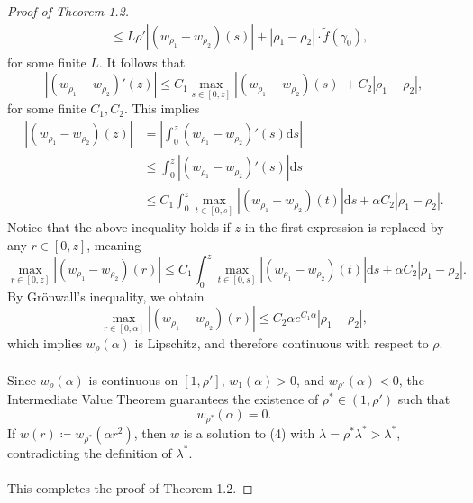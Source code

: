 \documentclass{article}
\begin{document}
\begin{proof}[Proof of Theorem 1.2]
\begin{align*}
        &\leq L\rho'|(w_{\rho_1} - w_{\rho_2})(s)| + |\rho_1-\rho_2|\cdot \tilde f(\gamma_0),
    \end{align*}
    for some finite $L$. It follows that
    \[|(w_{\rho_1} - w_{\rho_2})'(z)|\leq C_1\max_{s\in[0,z]}|(w_{\rho_1} - w_{\rho_2})(s)| + C_2 |\rho_1 -\rho_2|,\]
    for some finite $C_1, C_2$.
    This implies
    \begin{align*}
        |(w_{\rho_1} - w_{\rho_2})(z)| &= \left|\int_0^z(w_{\rho_1} - w_{\rho_2})'(s)\mathrm{d}s\right| \\
        &\leq \int_0^z |(w_{\rho_1} - w_{\rho_2})'(s)|\mathrm{d}s \\
        &\leq C_1\int_0^z\max_{t\in[0,s]}|(w_{\rho_1} - w_{\rho_2})(t)|\mathrm{d}s + \alpha C_2 |\rho_1-\rho_2|. 
    \end{align*}
    Notice that the above inequality holds if $z$ in the first expression is replaced by any $r\in[0,z]$, meaning
    \[\max_{r\in[0,z]}|(w_{\rho_1} - w_{\rho_2})(r)| \leq C_1\int_0^z\max_{t\in[0,s]}|(w_{\rho_1} - w_{\rho_2})(t)|\mathrm{d}s + \alpha C_2 |\rho_1-\rho_2|.\]
    By Grönwall's inequality, we obtain
    \[\max_{r\in[0,\alpha]}|(w_{\rho_1} - w_{\rho_2})(r)| \leq C_2\alpha e^{C_1\alpha}|\rho_1-\rho_2|,\]
    which implies $w_\rho(\alpha)$ is Lipschitz, and therefore continuous with respect to $\rho$. \\ \\
    Since $w_\rho(\alpha)$ is continuous on $[1,\rho']$, $w_1(\alpha) > 0$, and $w_{\rho'}(\alpha)< 0$, the Intermediate Value Theorem guarantees the existence of $\rho^*\in (1,\rho')$ such that
    \[w_{\rho^*}(\alpha) = 0.\]
   If $w(r)\coloneqq w_{\rho^*}(\alpha r^2)$, then $w$ is a solution to (4) with $\lambda = \rho^*\lambda^* > \lambda^*$, contradicting the definition of $\lambda^*$.
    \\ \\
    This completes the proof of Theorem 1.2.
    \end{proof}
\end{document}
